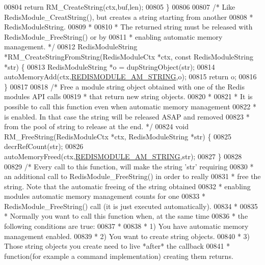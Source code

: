 \begin{DoxyCode}
{00804     \textcolor{keywordflow}{return} RM\_CreateString(ctx,buf,len);
00805 \}
00806 
00807 \textcolor{comment}{/* Like RedisModule\_CreatString(), but creates a string starting from another}
00808 \textcolor{comment}{ * RedisModuleString.}
00809 \textcolor{comment}{ *}
00810 \textcolor{comment}{ * The returned string must be released with RedisModule\_FreeString() or by}
00811 \textcolor{comment}{ * enabling automatic memory management. */}
00812 RedisModuleString *RM\_CreateStringFromString(RedisModuleCtx *ctx, \textcolor{keyword}{const} RedisModuleString *str) \{
00813     RedisModuleString *o = dupStringObject(str);
00814     autoMemoryAdd(ctx,\hyperlink{module_8c_a566ace39ef8d3d16c3f7d9d6c6b8e4ef}{REDISMODULE\_AM\_STRING},o);
00815     \textcolor{keywordflow}{return} o;
00816 \}
00817 
00818 \textcolor{comment}{/* Free a module string object obtained with one of the Redis modules API calls}
00819 \textcolor{comment}{ * that return new string objects.}
00820 \textcolor{comment}{ *}
00821 \textcolor{comment}{ * It is possible to call this function even when automatic memory management}
00822 \textcolor{comment}{ * is enabled. In that case the string will be released ASAP and removed}
00823 \textcolor{comment}{ * from the pool of string to release at the end. */}
00824 \textcolor{keywordtype}{void} RM\_FreeString(RedisModuleCtx *ctx, RedisModuleString *str) \{
00825     decrRefCount(str);
00826     autoMemoryFreed(ctx,\hyperlink{module_8c_a566ace39ef8d3d16c3f7d9d6c6b8e4ef}{REDISMODULE\_AM\_STRING},str);
00827 \}
00828 
00829 \textcolor{comment}{/* Every call to this function, will make the string 'str' requiring}
00830 \textcolor{comment}{ * an additional call to RedisModule\_FreeString() in order to really}
00831 \textcolor{comment}{ * free the string. Note that the automatic freeing of the string obtained}
00832 \textcolor{comment}{ * enabling modules automatic memory management counts for one}
00833 \textcolor{comment}{ * RedisModule\_FreeString() call (it is just executed automatically).}
00834 \textcolor{comment}{ *}
00835 \textcolor{comment}{ * Normally you want to call this function when, at the same time}
00836 \textcolor{comment}{ * the following conditions are true:}
00837 \textcolor{comment}{ *}
00838 \textcolor{comment}{ * 1) You have automatic memory management enabled.}
00839 \textcolor{comment}{ * 2) You want to create string objects.}
00840 \textcolor{comment}{ * 3) Those string objects you create need to live *after* the callback}
00841 \textcolor{comment}{ *    function(for example a command implementation) creating them returns.}
}
\end{DoxyCode}
